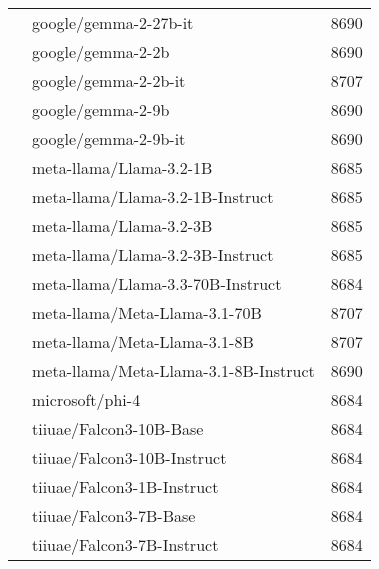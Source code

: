 \begin{table}[]
\begin{tabular}{llr}
 & google/gemma-2-27b-it & 8690 \\
 & google/gemma-2-2b & 8690 \\
 & google/gemma-2-2b-it & 8707 \\
 & google/gemma-2-9b & 8690 \\
 & google/gemma-2-9b-it & 8690 \\
 & meta-llama/Llama-3.2-1B & 8685 \\
 & meta-llama/Llama-3.2-1B-Instruct & 8685 \\
 & meta-llama/Llama-3.2-3B & 8685 \\
 & meta-llama/Llama-3.2-3B-Instruct & 8685 \\
 & meta-llama/Llama-3.3-70B-Instruct & 8684 \\
 & meta-llama/Meta-Llama-3.1-70B & 8707 \\
 & meta-llama/Meta-Llama-3.1-8B & 8707 \\
 & meta-llama/Meta-Llama-3.1-8B-Instruct & 8690 \\
 & microsoft/phi-4 & 8684 \\
 & tiiuae/Falcon3-10B-Base & 8684 \\
 & tiiuae/Falcon3-10B-Instruct & 8684 \\
 & tiiuae/Falcon3-1B-Instruct & 8684 \\
 & tiiuae/Falcon3-7B-Base & 8684 \\
 & tiiuae/Falcon3-7B-Instruct & 8684 \\
\bottomrule
\end{tabular}
    \label{tab:Meta-Llama-3.1-70B-Instruct}
\end{table}

